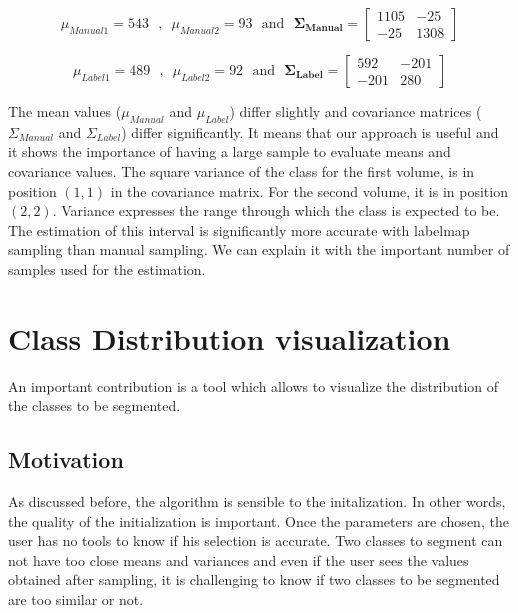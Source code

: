 \begin{equation*}
\mu_{Manual1} =  543 \mbox{~~,~~} \mu_{Manual2} =  93 \mbox{~~and~~} \mathbf{\Sigma_{Manual}} = 
 \begin{bmatrix}
   1105 & -25 \\
   -25 & 1308
 \end{bmatrix}
\end{equation*}

\begin{equation*}
\mu_{Label1} =  489 \mbox{~~,~~} \mu_{Label2} =  92 \mbox{~~and~~} \mathbf{\Sigma_{Label}} = 
 \begin{bmatrix}
   592 & -201 \\
   -201 & 280
 \end{bmatrix}
\end{equation*}

\par
The mean values ($\mu_{Manual}$ and $\mu_{Label}$) differ slightly and covariance matrices ($\Sigma_{Manual}$ and $\Sigma_{Label}$) differ significantly. It means that our approach is useful and it shows the importance of having a large sample to evaluate means and covariance values. The square variance of the class  for the first volume, is in position $(1,1)$ in the covariance matrix. For the second volume, it is in position $(2,2)$. Variance expresses the range through which the class is expected to be. The estimation of this interval is significantly more accurate with labelmap sampling than manual sampling. We can explain it with the important number of samples used for the estimation.

%
\section{Class Distribution visualization}\label{sec:tables}

An important contribution is a tool which allows to visualize the distribution of the classes to be segmented.

\subsection{Motivation}
As discussed before, the algorithm is sensible to the initalization. In other words, the quality of the initialization is important. Once the parameters are chosen, the user has no tools to know if his selection is accurate. Two classes to segment can not have too close means and variances and even if the user sees the values obtained after sampling, it is challenging to know if two classes to be segmented are too similar or not.
